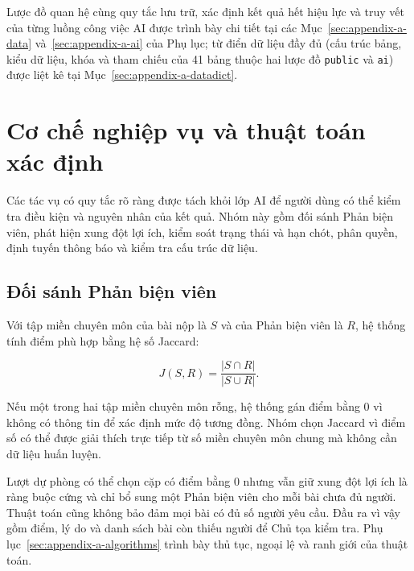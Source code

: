 Lược đồ quan hệ cùng quy tắc lưu trữ, xác định kết quả hết hiệu lực và truy vết của từng luồng công việc AI được trình bày chi tiết tại các Mục~\ref{sec:appendix-a-data} và~\ref{sec:appendix-a-ai} của Phụ lục; từ điển dữ liệu đầy đủ (cấu trúc bảng, kiểu dữ liệu, khóa và tham chiếu của 41 bảng thuộc hai lược đồ \texttt{public} và \texttt{ai}) được liệt kê tại Mục~\ref{sec:appendix-a-datadict}.
\section{Cơ chế nghiệp vụ và thuật toán xác định}
\label{sec:ch3-demo-deterministic}

Các tác vụ có quy tắc rõ ràng được tách khỏi lớp AI để người dùng có thể kiểm tra điều kiện và nguyên nhân của kết quả. Nhóm này gồm đối sánh Phản biện viên, phát hiện xung đột lợi ích, kiểm soát trạng thái và hạn chót, phân quyền, định tuyến thông báo và kiểm tra cấu trúc dữ liệu.

\subsection{Đối sánh Phản biện viên}

Với tập miền chuyên môn của bài nộp là \(S\) và của Phản biện viên là \(R\), hệ thống tính điểm phù hợp bằng hệ số Jaccard:

\[
J(S,R)=\frac{|S\cap R|}{|S\cup R|}.
\]

Nếu một trong hai tập miền chuyên môn rỗng, hệ thống gán điểm bằng \(0\) vì không có thông tin để xác định mức độ tương đồng. Nhóm chọn Jaccard vì điểm số có thể được giải thích trực tiếp từ số miền chuyên môn chung mà không cần dữ liệu huấn luyện.

Lượt dự phòng có thể chọn cặp có điểm bằng \(0\) nhưng vẫn giữ xung đột lợi ích là ràng buộc cứng và chỉ bổ sung một Phản biện viên cho mỗi bài chưa đủ người. Thuật toán cũng không bảo đảm mọi bài có đủ số người yêu cầu. Đầu ra vì vậy gồm điểm, lý do và danh sách bài còn thiếu người để Chủ tọa kiểm tra. Phụ lục~\ref{sec:appendix-a-algorithms} trình bày thủ tục, ngoại lệ và ranh giới của thuật toán.


